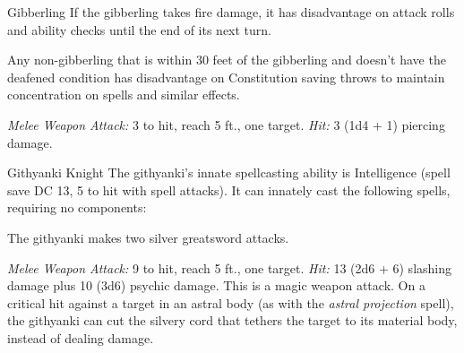 \documentclass[10pt,a4paper,twoside,bg=print,twocolumn,openany,nodeprecatedcode]{dndbook}
\begin{document}
\begin{DndMonster}[float=t]{Gibberling}
\DndMonsterBasics[
armor-class = {12},
hit-points = {\DndDice{2d6}},
speed = {30 ft.}
]
\DndMonsterAbilityScores[
 str = 13,
 dex = 14,
 con = 11,
 int = 5,
 wis = 7,
 cha = 5
]
\DndMonsterDetails[
condition-immunities = {charmed},
senses = {darkvision 120 ft., passive perception 8},
languages = {Gibberling},
challenge = 0,
]
If the gibberling takes fire damage, it has disadvantage on attack rolls and ability checks until the end of its next turn.

Any non-gibberling that is within 30 feet of the gibberling and doesn't have the deafened condition has disadvantage on Constitution saving throws to maintain concentration on spells and similar effects.

\textsl{Melee Weapon Attack:} 3 to hit, reach 5 ft., one target. \textsl{Hit:} 3 (1d4 + 1) piercing damage.

\end{DndMonster}



\begin{DndMonster}[float=t]{Githyanki Knight}
\DndMonsterBasics[
armor-class = {18 (\textit{plate armor})},
hit-points = {\DndDice{14d8 + 28}},
speed = {30 ft.}
]
\DndMonsterAbilityScores[
 str = 16,
 dex = 14,
 con = 15,
 int = 14,
 wis = 14,
 cha = 15
]
\DndMonsterDetails[
saving-throws = {Con +5, Int +5, Wis +5},
languages = {Gith},
challenge = 8,
]
The githyanki's innate spellcasting ability is Intelligence (spell save DC 13, 5 to hit with spell attacks). It can innately cast the following spells, requiring no components:
\begin{DndMonsterSpells}
\end{DndMonsterSpells}
The githyanki makes two silver greatsword attacks.

\textsl{Melee Weapon Attack:} 9 to hit, reach 5 ft., one target. \textsl{Hit:} 13 (2d6 + 6) slashing damage plus 10 (3d6) psychic damage. This is a magic weapon attack. On a critical hit against a target in an astral body (as with the \textit{astral projection} spell), the githyanki can cut the silvery cord that tethers the target to its material body, instead of dealing damage.

\end{DndMonster}
\end{document}
